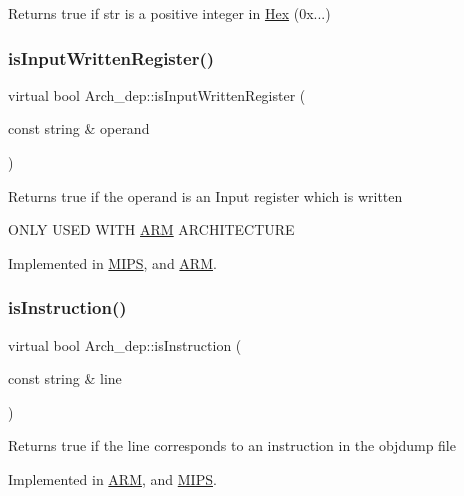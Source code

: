 Returns true if str is a positive integer in \hyperlink{classHex}{Hex} (0x...) \mbox{\label{classArch__dep_a3d926dc01afb4aebf1136dbe0962a30d}} 
\subsubsection{\texorpdfstring{is\+Input\+Written\+Register()}{isInputWrittenRegister()}}
{\footnotesize\ttfamily virtual bool Arch\+\_\+dep\+::is\+Input\+Written\+Register (\begin{DoxyParamCaption}\item[{const string \&}]{operand }\end{DoxyParamCaption})\hspace{0.3cm}{\ttfamily [pure virtual]}}

Returns true if the operand is an Input register which is written

O\+N\+LY U\+S\+ED W\+I\+TH \hyperlink{classARM}{A\+RM} A\+R\+C\+H\+I\+T\+E\+C\+T\+U\+RE 

Implemented in \hyperlink{classMIPS_a9bdb629497575a212f34ee951f1adfe0}{M\+I\+PS}, and \hyperlink{classARM_a4c35c414b95295974d60a365443c1a4a}{A\+RM}.

\mbox{\label{classArch__dep_ac537200db0a4cdd0eb3321b65111ccd5}} 
\subsubsection{\texorpdfstring{is\+Instruction()}{isInstruction()}}
{\footnotesize\ttfamily virtual bool Arch\+\_\+dep\+::is\+Instruction (\begin{DoxyParamCaption}\item[{const string \&}]{line }\end{DoxyParamCaption})\hspace{0.3cm}{\ttfamily [pure virtual]}}

Returns true if the line corresponds to an instruction in the objdump file 

Implemented in \hyperlink{classARM_abb7b6e518a9d8cb404ca7a30ad6e0326}{A\+RM}, and \hyperlink{classMIPS_a86a3224889b2d3e2486072b7bc5c26f3}{M\+I\+PS}.

